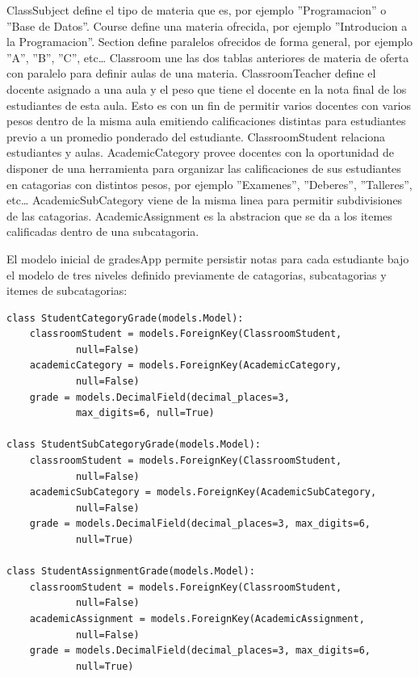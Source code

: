 \lstset{language=Bash}
ClassSubject define el tipo de materia que es, por ejemplo ''Programacion'' o ''Base de Datos''. Course define una materia ofrecida, por ejemplo ''Introducion a la Programacion''. Section define paralelos ofrecidos de forma general, por ejemplo ''A'', ''B'', ''C'', etc\ldots{} Classroom une las dos tablas anteriores de materia de oferta con paralelo para definir aulas de una materia. ClassroomTeacher define el docente asignado a una aula y el peso que tiene el docente en la nota final de los estudiantes de esta aula. Esto es con un fin de permitir varios docentes con varios pesos dentro de la misma aula emitiendo calificaciones distintas para estudiantes previo a un promedio ponderado del estudiante. ClassroomStudent relaciona estudiantes y aulas. AcademicCategory provee docentes con la oportunidad de disponer de una herramienta para organizar las calificaciones de sus estudiantes en catagorias con distintos pesos, por ejemplo ''Examenes'', ''Deberes'', ''Talleres'', etc\ldots{} AcademicSubCategory viene de la misma linea para permitir subdivisiones de las catagorias. AcademicAssignment es la abstracion que se da a los itemes calificadas dentro de una subcatagoria.

El modelo inicial de gradesApp permite persistir notas para cada estudiante bajo el modelo de tres niveles definido previamente de catagorias, subcatagorias y itemes de subcatagorias:
\lstset{language=Python}
\begin{lstlisting}
class StudentCategoryGrade(models.Model):
    classroomStudent = models.ForeignKey(ClassroomStudent,
            null=False)
    academicCategory = models.ForeignKey(AcademicCategory,
            null=False)
    grade = models.DecimalField(decimal_places=3,
            max_digits=6, null=True)

class StudentSubCategoryGrade(models.Model):
    classroomStudent = models.ForeignKey(ClassroomStudent,
            null=False)
    academicSubCategory = models.ForeignKey(AcademicSubCategory,
            null=False)
    grade = models.DecimalField(decimal_places=3, max_digits=6,
            null=True)

class StudentAssignmentGrade(models.Model):
    classroomStudent = models.ForeignKey(ClassroomStudent,
            null=False)
    academicAssignment = models.ForeignKey(AcademicAssignment,
            null=False)
    grade = models.DecimalField(decimal_places=3, max_digits=6,
            null=True)
\end{lstlisting}
\lstset{language=Bash}

